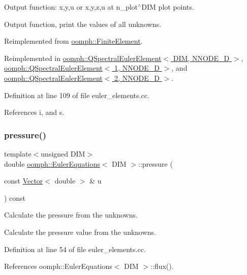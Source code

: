 Output function\+: x,y,u or x,y,z,u at n\+\_\+plot$^\wedge$\+D\+IM plot points. 

Output function, print the values of all unknowns. 

Reimplemented from \hyperlink{classoomph_1_1FiniteElement_afa9d9b2670f999b43e6679c9dd28c457}{oomph\+::\+Finite\+Element}.



Reimplemented in \hyperlink{classoomph_1_1QSpectralEulerElement_a026cdb8f38d01e15906db12ae1e4c4f1}{oomph\+::\+Q\+Spectral\+Euler\+Element$<$ D\+I\+M, N\+N\+O\+D\+E\+\_\+D $>$}, \hyperlink{classoomph_1_1QSpectralEulerElement_a026cdb8f38d01e15906db12ae1e4c4f1}{oomph\+::\+Q\+Spectral\+Euler\+Element$<$ 1, N\+N\+O\+D\+E\+\_\+D $>$}, and \hyperlink{classoomph_1_1QSpectralEulerElement_a026cdb8f38d01e15906db12ae1e4c4f1}{oomph\+::\+Q\+Spectral\+Euler\+Element$<$ 2, N\+N\+O\+D\+E\+\_\+D $>$}.



Definition at line 109 of file euler\+\_\+elements.\+cc.



References i, and s.

\mbox{\label{classoomph_1_1EulerEquations_a227a4ad24989e3d1e50e41815436791f}} 
\subsubsection{\texorpdfstring{pressure()}{pressure()}}
{\footnotesize\ttfamily template$<$unsigned D\+IM$>$ \\
double \hyperlink{classoomph_1_1EulerEquations}{oomph\+::\+Euler\+Equations}$<$ D\+IM $>$\+::pressure (\begin{DoxyParamCaption}\item[{const \hyperlink{classoomph_1_1Vector}{Vector}$<$ double $>$ \&}]{u }\end{DoxyParamCaption}) const}



Calculate the pressure from the unknowns. 

Calculate the pressure value from the unknowns. 

Definition at line 54 of file euler\+\_\+elements.\+cc.



References oomph\+::\+Euler\+Equations$<$ D\+I\+M $>$\+::flux().



